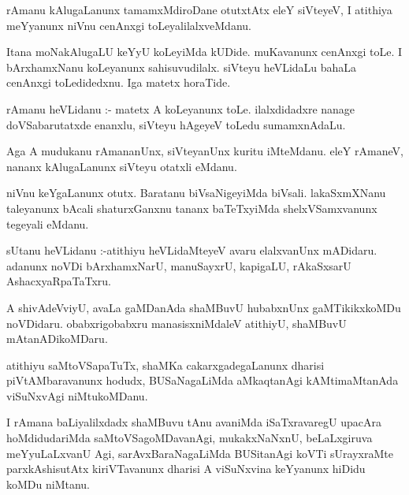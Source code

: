 \documentclass{article}
\begin{document}
\begin{mn}
rAmanu  kAlugaLanunx  tamamxMdiroDane  otutxtAtx  eleY  siVteyeV,  I  atithiya  meYyanunx  niVnu  cenAnxgi  toLeyalilalxveMdanu.
\end{mn}

\begin{mn}
Itana  moNakAlugaLU  keYyU  koLeyiMda  kUDide.  muKavanunx  cenAnxgi  toLe.  I  bArxhamxNanu  koLeyanunx  
sahisuvudilalx.  siVteyu  heVLidaLu  bahaLa  cenAnxgi  toLedidedxnu.  Iga  matetx  horaTide.
\end{mn}

\begin{mn}
rAmanu  heVLidanu :- matetx  A  koLeyanunx  toLe.  ilalxdidadxre  nanage  doVSabarutatxde  enanxlu,  siVteyu  hAgeyeV  
toLedu  sumamxnAdaLu.
\end{mn}

\begin{mn}
Aga  A  mudukanu  rAmananUnx,  siVteyanUnx  kuritu  iMteMdanu.  eleY  rAmaneV,  nananx  kAlugaLanunx  siVteyu  otatxli  eMdanu.  
\end{mn}

\begin{mn}
niVnu keYgaLanunx  otutx.  Baratanu  biVsaNigeyiMda  biVsali.  lakaSxmXNanu  taleyanunx  bAcali  shaturxGanxnu  tananx  baTeTxyiMda  
shelxVSamxvanunx  tegeyali  eMdanu.
\end{mn}

\begin{mn}
sUtanu  heVLidanu :-atithiyu  heVLidaMteyeV  avaru  elalxvanUnx  mADidaru.  adanunx  noVDi  bArxhamxNarU,  manuSayxrU,  kapigaLU,  
rAkaSxsarU  AshacxyaRpaTaTxru.
\end{mn}

\begin{mn}
A  shivAdeVviyU,  avaLa  gaMDanAda  shaMBuvU  hubabxnUnx  gaMTikikxkoMDu  noVDidaru.  obabxrigobabxru  manasisxniMdaleV  atithiyU,  
shaMBuvU  mAtanADikoMDaru.
\end{mn}

\begin{mn}
atithiyu  saMtoVSapaTuTx,  shaMKa  cakarxgadegaLanunx  dharisi  piVtAMbaravanunx  hodudx,  BUSaNagaLiMda  aMkaqtanAgi  kAMtimaMtanAda  
viSuNxvAgi  niMtukoMDanu.
\end{mn}

\begin{mn}
I  rAmana  baLiyalilxdadx  shaMBuvu  tAnu  avaniMda  iSaTxravaregU  upacAra  hoMdidudariMda  saMtoVSagoMDavanAgi,  mukakxNaNxnU,  
beLaLxgiruva  meYyuLaLxvanU  Agi,  sarAvxBaraNagaLiMda  BUSitanAgi  koVTi  sUrayxraMte  parxkAshisutAtx  kiriVTavanunx  dharisi 
A  viSuNxvina  keYyanunx  hiDidu  koMDu  niMtanu.
\end{mn}
\end{document}
